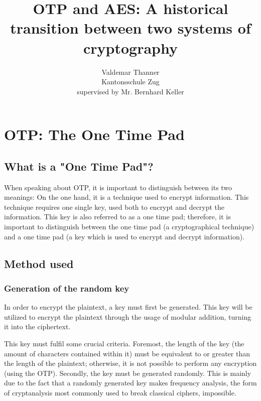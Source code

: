 \documentclass[12pt]{report}
\begin{document}
\title{OTP and AES: A historical transition between two systems of cryptography}
\author{Valdemar Thanner\\Kantonsschule Zug\\supervised by Mr. Bernhard Keller}
\maketitle
\tableofcontents
\chapter{OTP: The One Time Pad}
\section{What is a "One Time Pad"?}
When speaking about OTP, it is important to distinguish between its two meanings: On the one hand, it is a technique used to encrypt information. This technique requires one single key, used both to encrypt and decrypt the information. This key is also referred to as a one time pad; therefore, it is important to distinguish between the one time pad (a cryptographical technique) and a one time pad (a key which is used to encrypt and decrypt information).
\section{Method used}
\subsection{Generation of the random key}
In order to encrypt the plaintext, a key must first be generated. This key will be utilized to encrypt the plaintext through the usage of modular addition, turning it into the ciphertext.

This key must fulfil some crucial criteria. Foremost, the length of the key (the amount of  characters contained within it) must be equivalent to or greater than the length of the plaintext; otherwise, it is not possible to perform any encryption (using the OTP). Secondly, the key must be generated randomly. This is mainly due to the fact that a randomly generated key makes frequency analysis\cite{frequencyanalysis}, the form of cryptanalysis most commonly used to break classical ciphers, impossible.
\end{document}

